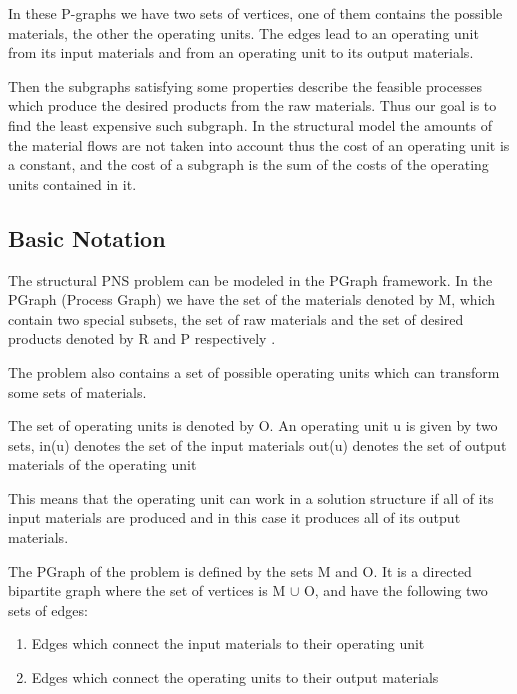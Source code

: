 In these P-graphs we have two sets of vertices, one of them contains the possible materials, 
the other the operating units. The edges lead to an operating unit from its input materials 
and from an operating unit to its output materials\cite{pns6 ,pns3}. 

Then the subgraphs satisfying some properties describe the feasible processes
which produce the desired products from the raw materials. 
Thus our goal is to find the least expensive such subgraph. 
In the structural model the amounts of the material flows are not taken into account 
thus the cost of an operating unit is a constant, and the cost of a subgraph 
is the sum of the costs of the operating units contained in it\cite{pns3 ,pns1}. 
\subsection{ Basic Notation }

The structural PNS problem can be modeled in the PGraph framework.
In the PGraph (Process Graph) we have the set of the materials denoted by M,
which contain two special subsets, the set of raw materials and the set of 
desired products denoted by R and P respectively \cite{pns3}.

The problem also contains a set of possible operating units which can transform some sets of materials. 

The set of operating units is denoted by O. An operating unit u is given by two sets, 
in(u) denotes the set of the input materials out(u) denotes the set of output materials of the operating unit

This means that the operating unit can work in a solution structure if all of its input materials are produced and in this case it 
produces all of its output materials\cite{pns3 ,pns1}. 

The PGraph  of the problem is defined by the sets M and O. It is a directed bipartite graph where the set of vertices is M $\cup$ O, and have the following two sets of edges:
\begin{enumerate}
\item Edges which connect the input materials to their operating unit
\item Edges which connect the operating units to their output materials
\end{enumerate}

